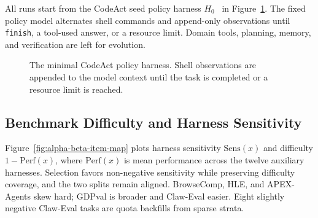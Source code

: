All runs start from the CodeAct seed policy harness
$H_0$~\cite{wang2024executable} in Figure~\ref{fig:seed-policy-harness}.  The
fixed policy model alternates shell commands and append-only observations until
\texttt{finish}, a tool-used answer, or a resource limit.  Domain tools,
planning, memory, and verification are left for evolution.

\begin{figure}[htbp]
    \centering
    \caption{The minimal CodeAct policy harness. Shell observations are appended
    to the model context until the task is completed or a resource limit is
    reached.}
    \label{fig:seed-policy-harness}
\end{figure}

\subsection{Benchmark Difficulty and Harness Sensitivity}
\label{app:benchmark-item-map}

Figure~\ref{fig:alpha-beta-item-map} plots harness sensitivity
$\mathrm{Sens}(x)$ and difficulty $1-\mathrm{Perf}(x)$, where
$\mathrm{Perf}(x)$ is mean performance across the twelve auxiliary harnesses.
Selection favors non-negative sensitivity while preserving difficulty coverage,
and the two splits remain aligned.  BrowseComp, HLE, and APEX-Agents skew hard;
GDPval is broader and Claw-Eval easier.  Eight slightly negative Claw-Eval tasks
are quota backfills from sparse strata.

